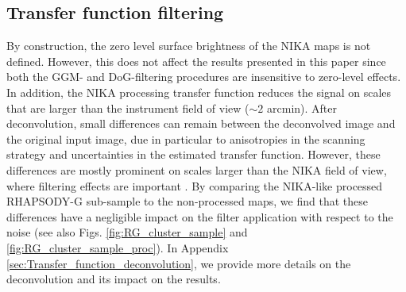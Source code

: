 \documentclass[traditabstract]{aa}
\begin{document}
\subsection{Transfer function filtering}\label{sec:Transfer_function_filtering}
By construction, the zero level surface brightness of the NIKA maps is not defined. However, this does not affect the results presented in this paper since both the GGM- and DoG-filtering procedures are insensitive to zero-level effects. In addition, the NIKA processing transfer function reduces the signal on scales that are larger than the instrument field of view ($\sim 2$ arcmin). After deconvolution, small differences can remain between the deconvolved image and the original input image, due in particular to anisotropies in the scanning strategy and uncertainties in the estimated transfer function. However, these differences are mostly prominent on scales larger than the NIKA field of view, where filtering effects are important \citep{Adam2015}. By comparing the NIKA-like processed RHAPSODY-G sub-sample to the non-processed maps, we find that these differences have a negligible impact on the filter application with respect to the noise (see also Figs. \ref{fig:RG_cluster_sample} and \ref{fig:RG_cluster_sample_proc}). In Appendix \ref{sec:Transfer_function_deconvolution}, we provide more details on the deconvolution and its impact on the results.

\end{document}
